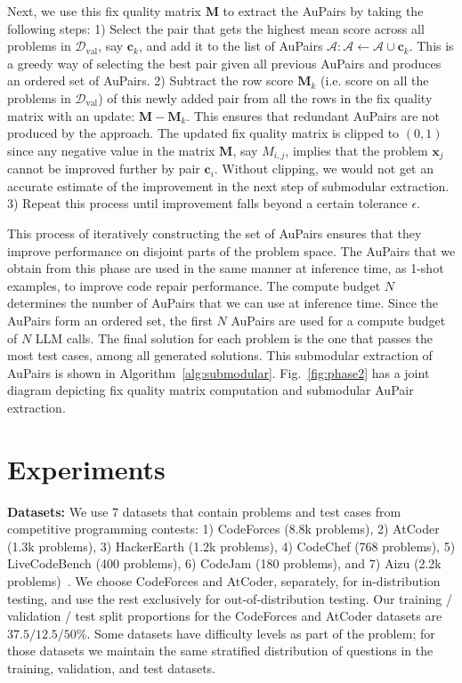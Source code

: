 \documentclass[11pt, a4paper, logo, copyright]{googledeepmind}
\def\aupair/{\textcolor{golden}{Au}Pair}
\def\aupairs/{\textcolor{golden}{Au}Pairs}
\begin{document}
Next, we use this fix quality matrix $\bm{M}$ to extract the \aupairs/ by taking the following steps: 
1) Select the pair that gets the highest mean score across all problems in $\mathcal{D}_\text{val}$, say $\bm{c}_k$, and add it to the list of \aupairs/ $\mathcal{A}: \mathcal{A} \gets \mathcal{A} \cup \bm{c}_k$. This is a greedy way of selecting the best pair given all previous \aupairs/ and produces an ordered set of \aupairs/. 2) Subtract the row score $\bm{M}_k$ (i.e. score on all the problems in $\mathcal{D}_\text{val}$) of this newly added pair from all the rows in the fix quality matrix with an update: $\bm{M} - \bm{M}_k$. This ensures that redundant \aupairs/ are not produced by the approach. The updated fix quality matrix is clipped to $(0, 1)$ since any negative value in the matrix $\bm{M}$, say $M_{i,j}$, implies that the problem $\bm{x}_j$ cannot be improved further by pair $\bm{c}_i$. Without clipping, we would not get an accurate estimate of the improvement in the next step of submodular extraction. 3) Repeat this process until improvement falls beyond a certain tolerance $\epsilon$.

This process of iteratively constructing the set of \aupairs/ ensures that they improve performance on disjoint parts of the problem space. The \aupairs/ that we obtain from this phase are used in the same manner at inference time, as 1-shot examples, to improve code repair performance. The compute budget $N$ determines the number of \aupairs/ that we can use at inference time. Since the \aupairs/ form an ordered set, the first $N$ \aupairs/ are used for a compute budget of $N$ LLM calls. The final solution for each problem is the one that passes the most test cases, among all generated solutions. This submodular extraction of \aupairs/ is shown in Algorithm~\ref{alg:submodular}. Fig.~\ref{fig:phase2} has a joint diagram depicting fix quality matrix computation and submodular \aupair/ extraction.



\section{Experiments}
\label{sec:results}

\textbf{Datasets:} We use 7 datasets that contain problems and test cases from competitive programming contests: 1) CodeForces (8.8k problems), 2) AtCoder (1.3k problems), 3) HackerEarth (1.2k problems), 4) CodeChef (768 problems), 5) LiveCodeBench (400 problems),  6) CodeJam (180 problems), and 7) Aizu (2.2k problems)~\citep{codecontests, jain2024livecodebench}. We choose CodeForces and AtCoder, separately, for in-distribution testing, and use the rest exclusively for out-of-distribution testing. Our training / validation / test split proportions for the CodeForces and AtCoder datasets are $37.5 / 12.5 / 50\%$. Some datasets have difficulty levels as part of the problem; for those datasets we maintain the same stratified distribution of questions in the training, validation, and test datasets.
\end{document}
